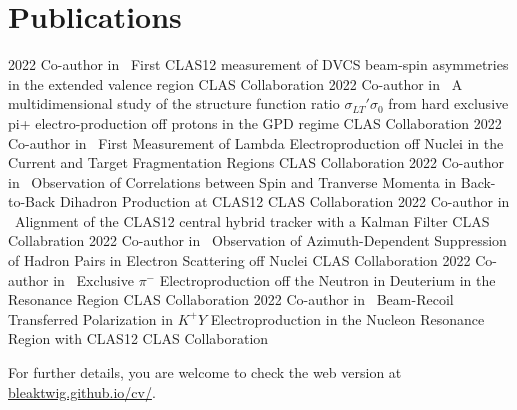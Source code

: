 \documentclass[a4paper]{cv-style}
\begin{document}
\section{Publications}
    \begin{entrylist}
        \entry
            {2022}
            {{\normalfont Co-author in} ~First CLAS12 measurement of DVCS beam-spin asymmetries in the extended valence region}
            {CLAS Collaboration}
            {\vspace{-0.3cm}}
        \entry
            {2022}
            {{\normalfont Co-author in} ~A multidimensional study of the structure function ratio $\sigma_{LT}'\sigma_0$ from hard exclusive pi+ electro-production off protons in the GPD regime}
            {CLAS Collaboration}
            {\vspace{-0.3cm}}
        \entry
            {2022}
            {{\normalfont Co-author in} ~First Measurement of Lambda Electroproduction off Nuclei in the Current and Target Fragmentation Regions}
            {CLAS Collaboration}
            {\vspace{-0.3cm}}
        \entry
            {2022}
            {{\normalfont Co-author in} ~Observation of Correlations between Spin and Tranverse Momenta in Back-to-Back Dihadron Production at CLAS12}
            {CLAS Collaboration}
            {\vspace{-0.3cm}}
        \entry
            {2022}
            {{\normalfont Co-author in} ~Alignment of the CLAS12 central hybrid tracker with a Kalman Filter \hspace{1.5cm}}
            {CLAS Collabration}
            {\vspace{-0.3cm}}
        \entry
            {2022}
            {{\normalfont Co-author in} ~Observation of Azimuth-Dependent Suppression of Hadron Pairs in Electron Scattering off Nuclei}
            {CLAS Collaboration}
            {\vspace{-0.3cm}}
        \entry
            {2022}
            {{\normalfont Co-author in} ~Exclusive $\pi^-$ Electroproduction off the Neutron in Deuterium in the Resonance Region}
            {CLAS Collaboration}
            {\vspace{-0.3cm}}
        \entry
            {2022}
            {{\normalfont Co-author in} ~Beam-Recoil Transferred Polarization in $K^+Y$ Electroproduction in the Nucleon Resonance Region with CLAS12}
            {CLAS Collaboration}
            {\vspace{-0.3cm}}
    \end{entrylist}

\vspace{0.4cm}
For further details, you are welcome to check the web version at \href{https://bleaktwig.github.io/cv/}{bleaktwig.github.io/cv/}.
\end{document}
